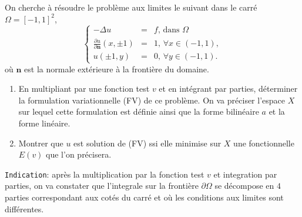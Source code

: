 \documentclass[12pt,a4paper]{article}
\begin{document}
\noindent  On cherche \`a r\'esoudre le probl\`eme aux
limites le suivant dans le carr\'e $\Omega=[-1,1]^2$, 
\begin{equation}\label{eq:tube}
\left\{\begin{array}{lcl}
-\Delta u &=& f,\,\text{dans }\Omega\\[2ex]
\displaystyle \frac{\partial u}{\partial \mathbf{n}}(x,\pm 1)&=&1,\,\forall x\in (-1,1),\\[2ex]
u(\pm 1,y)&=&0,\,\forall y\in  (-1,1).
\end{array}\right.
\end{equation}
où $\mathbf{n}$ est la normale extérieure à la frontière du domaine. 
\begin{enumerate}
\item En multipliant par une fonction test $v$ et en intégrant par parties, d\'eterminer la formulation variationnelle (FV) de ce problème. On va préciser l'espace $X$ sur lequel cette formulation est définie ainsi que la forme bilinéaire $a$ et la forme linéaire.
\item Montrer que $u$ est solution de (FV) ssi elle minimise sur $X$ une fonctionnelle $E(v)$ que l'on pr\'ecisera.
\end{enumerate}
 \texttt{Indication}: apr\`es la
  multiplication par la fonction test $v$ et integration par parties,
  on va constater que l'integrale sur la fronti\`ere $\partial\Omega$
  se d\'ecompose en $4$ parties correspondant aux cot\'es du carr\'e
  et o\`u les conditions aux limites sont diff\'erentes.\\
\end{document}

